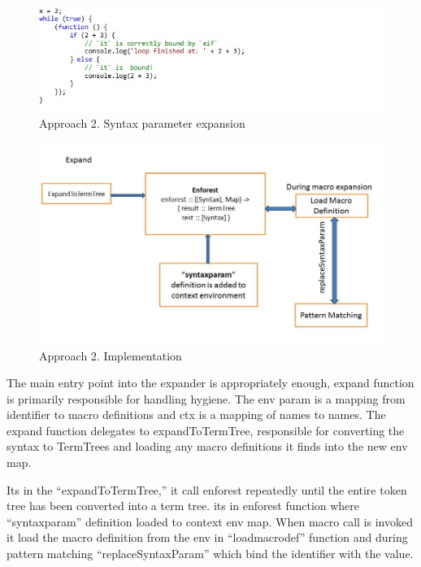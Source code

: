 \begin{figure}[htb]
\centering
\includegraphics[width=1.0\textwidth]{images/Appraoch22.jpg}
\caption{ Approach 2. Syntax parameter expansion} 
\label{fig:AST}
\end{figure}

\newpage
\begin{figure}[htb]
\centering
\includegraphics[width=1.0\textwidth]{images/CodeWorking.jpg}
\caption{ Approach 2. Implementation } 
\label{fig:AST}
\end{figure}

The main entry point into the expander is appropriately enough,
expand function is primarily responsible for handling hygiene. The env param is a mapping from identifier to macro definitions and ctx is a mapping of names to names. The expand function delegates to expandToTermTree, responsible for converting the syntax to TermTrees and loading any macro definitions it finds into the new env map.

Its in the ``expandToTermTree,'' it call enforest repeatedly until the entire token tree has been converted into a term tree. its in enforest function where ``syntaxparam'' definition loaded to context env map. When macro call is invoked it load the macro definition from the env in ``loadmacrodef'' function and during pattern matching ``replaceSyntaxParam'' which bind the identifier with the value.